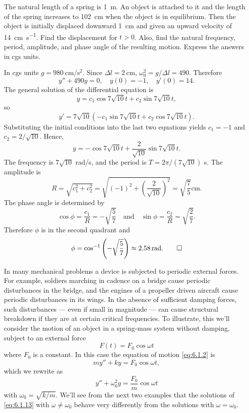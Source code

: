 \begin{example}\label{example:6.1.3}
The natural length of a spring is \qty{1}{\meter}. An object is attached to it and
the length of the spring increases to \qty{102}{\centi\meter} when the object is in
equilibrium. Then the object is initially displaced downward \qty{1}{\centi\meter} and
given an upward velocity of \qty{14}{\centi\meter\per\second}. Find the displacement for
$t>0$. Also, find the natural frequency, period, amplitude, and phase
angle of the resulting motion. Express the answers in cgs units.
\end{example}

\begin{solution}
In cgs units $g=\qty{980}{\centi\meter\per\second\squared}$. Since $\Delta l=\qty{2}{\centi\meter}$,
$\omega_0^2=g/\Delta l=490$.
Therefore
\[
y''+490y=0, \quad  y(0)=-1,\quad y'(0)=14.
\]
 The general solution of the differential equation is
\[
y=c_1\cos7\sqrt{10}t+c_2\sin7\sqrt{10}t,
\]
so
\[
y'=7\sqrt{10}\left(-c_1\sin7\sqrt{10}t+c_2\cos7\sqrt{10}t\right).
\]
Substituting the initial conditions into the last two equations yields
$c_1=-1$ and $c_2=2/\sqrt{10}$. Hence,
\[
y=-\cos7\sqrt{10}t+\frac{2}{\sqrt{10}}\sin7\sqrt{10}t.
\]
The frequency is $7\sqrt{10}$ rad/s, and  the period
is $T=2\pi/(7\sqrt{10})$  s.
The amplitude  is
\[
R=\sqrt{c_1^2+c_2^2}=\sqrt{(-1)^2+\left(\frac{2}{\sqrt{10}}\right)^2}=
\sqrt{\frac{7}{5}}\unit{\centi\meter}.
\]
The  phase angle  is determined by
\[
\cos\phi=\frac{c_1}{R}=-\sqrt{\frac{5}{7}}\quad\text{and}\quad \sin\phi=
\frac{c_2}{R}=\sqrt{\frac{2}{7}}.
\]
Therefore $\phi$ is in the second quadrant and
\[
\phi=\cos^{-1}\left(-\sqrt{\frac{5}{7}}\right)\approx\qty{2.58}{\radian}.\qedhere
\]
\end{solution}



In many mechanical problems a device is subjected to periodic external
forces. For example, soldiers marching in cadence on a bridge cause
periodic disturbances in the bridge, and the engines of a propeller
driven aircraft cause periodic disturbances in its wings. In the
absence of sufficient damping forces, such disturbances --- even if
small in magnitude --- can cause structural breakdown if they are at
certain critical frequencies. To illustrate, this we'll consider the
motion of an object in a spring-mass system without damping, subject
to an external force
\[
F(t)=F_0\cos\omega t
\]
where $F_0$ is a constant. In this case the equation of motion
\eqref{eq:6.1.2} is
\[
my''+ky=F_0\cos\omega t,
\]
which we rewrite  as
\begin{equation}\label{eq:6.1.13}
y''+\omega_0^2y=\frac{F_0}{m}\cos\omega t
\end{equation}
with $\omega_0=\sqrt{k/m}$.
We'll see from the next two examples that the solutions of
\eqref{eq:6.1.13}
with $\omega\ne\omega_0$ behave very differently from the solutions with
$\omega=\omega_0$.




